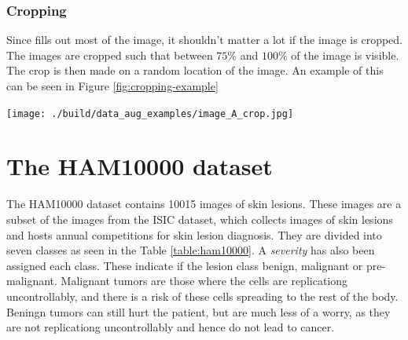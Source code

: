 \subsubsection{Cropping}
Since fills out most of the image,
it shouldn't matter a lot if the image is cropped.
The images are cropped such that between $75\%$ and $100\%$ of the image is visible.
The crop is then made on a random location of the image.
An example of this can be seen in Figure \ref{fig:cropping-example}

\begin{center}
    \texttt{[image: ./build/data\_aug\_examples/image\_A\_crop.jpg]}
    \label{fig:cropping-example}
\end{center}



\section{The HAM10000 dataset}
The HAM10000 dataset contains 10015 images of skin lesions.
These images are a subset of the images from the ISIC dataset\cite{ISIC_Dataset_2018},
which collects images of skin lesions and hosts annual competitions for skin lesion diagnosis.
They are divided into seven classes as seen in the Table \ref{table:ham10000}.
A \textit{severity} has also been assigned each class.
These indicate if the lesion class benign, malignant or pre-malignant.
Malignant tumors are those where the cells are replicationg uncontrollably,
and there is a risk of these cells spreading to the rest of the body.
Beningn tumors can still hurt the patient, but are much less of a worry,
as they are not replicationg uncontrollably and hence do not lead to cancer.

